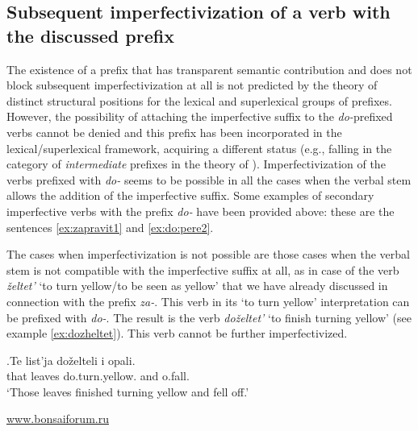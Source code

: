 \subsection{Subsequent imperfectivization of a verb with the discussed prefix}
The existence of a prefix that has transparent semantic contribution and does not block subsequent imperfectivization at all is not predicted by the theory of distinct structural positions for the lexical and superlexical groups of prefixes. However, the possibility of attaching the imperfective suffix to the \textit{do-}prefixed verbs cannot be denied and this prefix has been incorporated in the lexical/superlexical framework, acquiring a different status (e.g., falling in the category of \textit{intermediate} prefixes in the theory of \citealt{Tatevosov:07}). Imperfectivization of the verbs prefixed with \textit{do-} seems to be possible in all the cases when the verbal stem allows the addition of the imperfective suffix. Some examples of secondary imperfective verbs with the prefix \textit{do-} have been provided above: these are the sentences \ref{ex:zapravit1} and \ref{ex:do:pere2}.

The cases when imperfectivization is not possible are those cases when the verbal stem is not compatible with the imperfective suffix at all, as in case of the verb \textit{\v{z}eltet'} `to turn yellow/to be seen as yellow' that we have already discussed in connection with the prefix \textit{za-}. This verb in its `to turn yellow' interpretation can be prefixed with \textit{do-}. The result is the verb \textit{do\v{z}eltet'} `to finish turning yellow' (see example \ref{ex:dozheltet}). This verb cannot be further imperfectivized. 

\exg.\label{ex:dozheltet}Te list'ja do\v{z}elteli i opali.\\
that leaves do.turn.yellow. and o.fall.\\
\vspace{0.5em}
`Those leaves finished turning yellow and fell off.'
\begin{flushright}
\vspace{-0.5em}
\url{www.bonsaiforum.ru}
\end{flushright}

